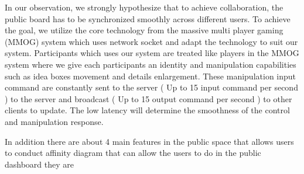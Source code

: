 \documentclass{sigchi}
\begin{document}
\begin{itemize}
In our observation, we strongly hypothesize that to achieve collaboration, the public board has to be synchronized smoothly across different users. To achieve the goal, we utilize the core technology from the massive multi player gaming (MMOG) system which uses network socket and adapt the technology to suit our system. Participants which uses our system are treated like players in the MMOG system where we give each participants an identity and manipulation capabilities such as idea boxes movement and details enlargement. These manipulation input command are constantly sent to the server ( Up to 15 input command per second )  to the server and broadcast ( Up to 15 output command per second ) to other clients to update.  The low latency will determine the smoothness of the control and manipulation response. 


In addition there are about 4 main features in the public space that allows users to conduct affinity diagram  that can allow the users to do in the public dashboard they are 

\begin{itemize}



\end{itemize}
\end{itemize}
\end{document}
